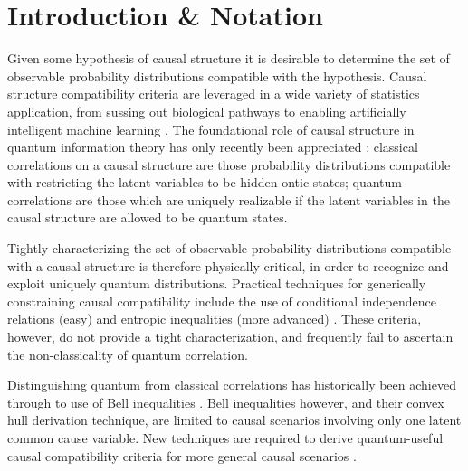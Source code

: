 \section{Introduction \& Notation}
Given some hypothesis of causal structure it is desirable to determine the set of observable probability distributions compatible with the hypothesis. Causal structure compatibility criteria are leveraged in a wide variety of statistics application, from sussing out biological pathways to enabling artificially intelligent machine learning \cite{pearl2009causality,spirtes2011causation,studeny2005probabilistic,koller2009probabilistic}. The foundational role of causal structure in quantum information theory has only recently been appreciated \cite{WoodSpekkens,fritz2012bell,pusey2014gdag,BeyondBellII}: classical correlations on a causal structure are those probability distributions compatible with restricting the latent variables to be hidden ontic states; quantum correlations are those which are uniquely realizable if the latent variables in the causal structure are allowed to be quantum states.

Tightly characterizing the set of observable probability distributions compatible with a causal structure is therefore physically critical, in order to recognize and exploit uniquely quantum distributions. Practical techniques for generically constraining causal compatibility include the use of conditional independence relations (easy) \cite{pearl2009causality,spirtes2011causation,studeny2005probabilistic,koller2009probabilistic} and entropic inequalities (more advanced) \cite{fritz2013marginal,chaves2014novel,chaves2014informationinference}. These criteria, however, do not provide a tight characterization, and frequently fail to ascertain the non-classicality of quantum correlation. 

Distinguishing quantum from classical correlations has historically been achieved through to use of Bell inequalities \cite{bell1966lhvm,GisinFramework2012,scarani2012device,Brunner2013Bell}. Bell inequalities however, and their convex hull derivation technique, are limited to causal scenarios involving only one latent common cause variable. New techniques are required to derive quantum-useful causal compatibility criteria for more general causal scenarios \cite{fritz2012bell,pusey2014gdag,BeyondBellII}.

